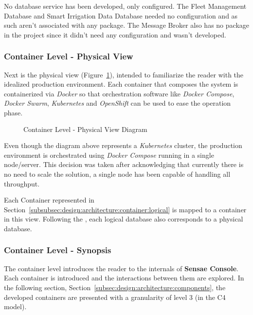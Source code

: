 No database service has been developed, only configured. The Fleet Management Database and Smart Irrigation Data Database needed no configuration and as such aren't associated with any package. The Message Broker also has no package in the project since it didn't need any configuration and wasn't developed.

\subsubsection*{Container Level - Physical View}
\label{subsubsec:design:architecture:container:physical}

Next is the physical view (Figure~\ref{fig:design:architecture:container:physical:diagram}), intended to familiarize the reader with the idealized production environment. Each container that composes the system is containerized via \textit{Docker} so that orchestration software like \textit{Docker Compose}, \textit{Docker Swarm}, \textit{Kubernetes} and \textit{OpenShift} can be used to ease the operation phase.

\begin{figure}[H]
   \centering
   \resizebox{\columnwidth}{!}
   {
      
   }
   \caption[Container Level - Physical View Diagram]{Container Level - Physical View Diagram}
   \label{fig:design:architecture:container:physical:diagram}
\end{figure}

Even though the diagram above represents a \textit{Kubernetes} cluster, the production environment is orchestrated using \textit{Docker Compose} running in a single node/server. This decision was taken after acknowledging that currently there is no need to scale the solution, a single node has been capable of handling all throughput.

Each Container represented in Section~\ref{subsubsec:design:architecture:container:logical} is mapped to a container in this view. Following the , each logical database also corresponds to a physical database. 

\subsubsection*{Container Level - Synopsis}
\label{subsubsec:design:architecture:container:synopsis}

The container level introduces the reader to the internals of \textbf{Sensae Console}. Each container is introduced and the interactions between them are explored.
In the following section, Section~\ref{subsec:design:architecture:components}, the developed containers are presented with a granularity of level 3 (in the C4 model).

